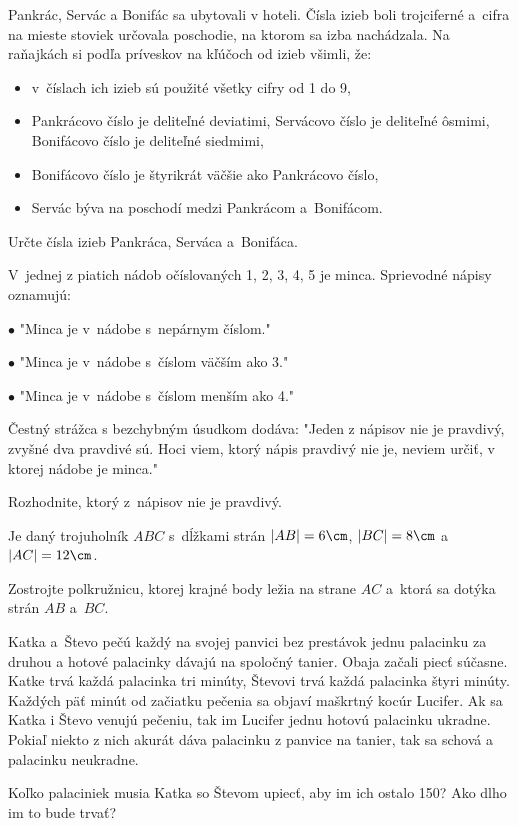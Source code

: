 {%
Pankrác, Servác a Bonifác sa ubytovali v hoteli.
Čísla izieb boli trojciferné a~cifra na mieste stoviek určovala poschodie, na ktorom sa izba nachádzala.
Na raňajkách si podľa príveskov na kľúčoch od izieb všimli, že:
\begin{itemize}
  \item v~číslach ich izieb sú použité všetky cifry od 1 do 9,
  \item Pankrácovo číslo je deliteľné deviatimi, Servácovo číslo je deliteľné ôsmimi, Bonifácovo číslo je deliteľné siedmimi,
  \item Bonifácovo číslo je štyrikrát väčšie ako Pankrácovo číslo,
  \item Servác býva na poschodí medzi Pankrácom a~Bonifácom.
\end{itemize}
Určte čísla izieb Pankráca, Serváca a~Bonifáca.
}

{%
V~jednej z piatich nádob očíslovaných 1, 2, 3, 4, 5 je minca.
Sprievodné nápisy oznamujú:
\smallskip
\item{$\bullet$} "Minca je v~nádobe s~nepárnym číslom."
\item{$\bullet$} "Minca je v~nádobe s~číslom väčším ako 3."
\item{$\bullet$} "Minca je v~nádobe s~číslom menším ako 4."

\smallskip
Čestný strážca s bezchybným úsudkom dodáva:
\smallskip
"Jeden z nápisov nie je pravdivý, zvyšné dva pravdivé sú.
Hoci viem, ktorý nápis pravdivý nie je, neviem určiť, v ktorej nádobe je minca."

\nopagebreak\smallskip
Rozhodnite, ktorý z~nápisov nie je pravdivý.
}

{%
Je daný trojuholník $ABC$ s~dĺžkami strán $|AB|=6\cm$, $|BC|=8\cm$ a~$|AC|=12\cm$.

Zostrojte polkružnicu, ktorej krajné body ležia na strane $AC$ a~ktorá sa dotýka strán $AB$ a~$BC$.
}

{%
Katka a~Števo pečú každý na svojej panvici bez prestávok jednu palacinku za druhou a hotové palacinky dávajú na spoločný tanier.
Obaja začali piecť súčasne. Katke trvá každá palacinka tri minúty, Števovi trvá každá palacinka štyri minúty.
Každých päť minút od začiatku pečenia sa objaví maškrtný kocúr Lucifer.
Ak sa Katka i Števo venujú pečeniu, tak im Lucifer jednu hotovú palacinku ukradne. Pokiaľ niekto z nich akurát dáva palacinku z panvice na tanier, tak sa schová a palacinku neukradne.

Koľko palaciniek musia Katka so Števom upiecť, aby im ich ostalo 150?
Ako dlho im to bude trvať?
}

